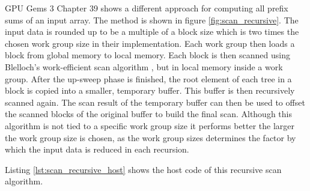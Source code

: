 GPU Gems 3 Chapter 39 \cite{gpu_gems_3_chapter_39} shows a different approach for computing all prefix sums of an input array. The method is shown in figure \ref{fig:scan_recursive}. The input data is rounded up to be a multiple of a block size which is two times the chosen work group size in their implementation. Each work group then loads a block from global memory to local memory. Each block is then scanned using Blelloch's work-efficient scan algorithm \cite{scan_blelloch}, but in local memory inside a work group. After the up-sweep phase is finished, the root element of each tree in a block is copied into a smaller, temporary buffer. This buffer is then recursively scanned again. The scan result of the temporary buffer can then be used to offset the scanned blocks of the original buffer to build the final scan.
Although this algorithm is not tied to a specific work group size it performs better the larger the work group size is chosen, as the work group sizes determines the factor by which the input data is reduced in each recursion.

Listing \ref{lst:scan_recursive_host} shows the host code of this recursive scan algorithm.



